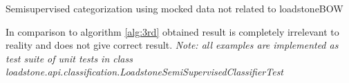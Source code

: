 \begin{algorithm}[h]
	\hfill \break
	\caption{Semisupervised categorization using mocked data not related to loadstoneBOW}\label{alg:8th}
\end{algorithm}
\newline
In comparison to algorithm \ref{alg:3rd} obtained result is completely irrelevant to reality and does not give correct result.
\newline 
\textit{Note: all examples are implemented as test suite of unit tests in class \newline loadstone.api.classification.LoadstoneSemiSupervisedClassifierTest}


